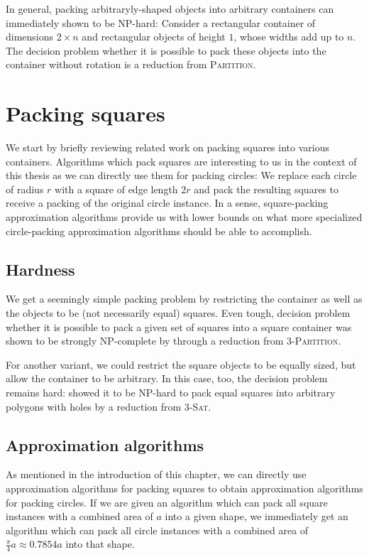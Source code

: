 \documentclass[a4paper,style=print,oneside,bibliography=totoc,nexus,lnum,extramargin]{tubsbook}
\begin{document}
In general, packing arbitraryly-shaped objects into arbitrary containers can immediately shown to be NP-hard: Consider a rectangular container of dimensions $2 \times n$ and rectangular objects of height $1$, whose widths add up to $n$. The decision problem whether it is possible to pack these objects into the container without rotation is a reduction from \textsc{Partition}.

\section{Packing squares}\label{sec:related-squares}

We start by briefly reviewing related work on packing squares into various containers.
Algorithms which pack squares are interesting to us in the context of this thesis as we can directly use them for packing circles: We replace each circle of radius $r$ with a square of edge length $2r$ and pack the resulting squares to receive a packing of the original circle instance. In a sense, square-packing approximation algorithms provide us with lower bounds on what more specialized circle-packing approximation algorithms should be able to accomplish.

\subsection{Hardness}

We get a seemingly simple packing problem by restricting the container as well as the objects to be (not necessarily equal) squares.
Even tough, decision problem whether it is possible to pack a given set of squares into a square container was shown to be strongly NP-complete by \textcite{LTWYC1990packing} through a reduction from \textsc{3-Partition}.

For another variant, we could restrict the square objects to be equally sized, but allow the container to be arbitrary.
In this case, too, the decision problem remains hard:
\textcite{FPT1981optimal} showed it to be NP-hard to pack equal squares into arbitrary polygons with holes by a reduction from \textsc{3-Sat}.

\subsection{Approximation algorithms}

As mentioned in the introduction of this chapter, we can directly use approximation algorithms for packing squares to obtain approximation algorithms for packing circles.
If we are given an algorithm which can pack all square instances with a combined area of $a$ into a given shape, we immediately get an algorithm which can pack all circle instances with a combined area of $\frac{\pi}{4}a \approx 0.7854a$ into that shape. 
\end{document}
